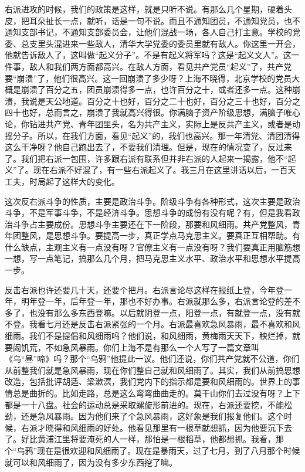 右派进攻的时候，我们的政策是这样，就是只听不说。有那么几个星期，硬着头皮，把耳朵扯长一点，就听，话是一句不说。而且不通知团员，不通知党员，也不通知支部书记，不通知支部委员会，让他们混战一场，各人自己打主意。学校的党委、总支里头混进来一些敌人，清华大学党委的委员里就有敌人。你这里一开会，他就告诉敌人了，这叫做“起义分子”。不是有起义将军吗？这是“起义文人”。这一件事，敌人和我们两方面都高兴。在敌人方面，看见共产党员“起义”了，共产党要“崩溃”了，他们很高兴。这一回崩溃了多少呀？上海不晓得，北京学校的党员大概是崩溃了百分之五，团员崩溃得多一点，也许百分之十，或者还多一点。这种崩溃，我说是天公地道。百分之十也好，百分之二十也好，百分之三十也好，百分之四十也好，总而言之，崩溃了我就高兴得很。你满脑子资产阶级思想，满脑子唯心论，你钻进共产党、青年团里头，名为共产主义，实际上是反共产主义，或者是动摇分子。所以，在我们方面，看见“起义”的，我们也高兴。那一年清党、清团清得这么干净呀？他自己跑出去了，不要我们清理。但是，现在的情况变了，反过来了。我们把右派一包围，许多跟右派有联系但并非右派的人起来一揭露，他不“起义”了。现在右派不好混了，有一些右派起义了。我三月在这里讲话以后，一百天工夫，时局起了这样大的变化。

这次反右派斗争的性质，主要是政治斗争。阶级斗争有各种形式，这次主要是政治斗争，不是军事斗争，不是经济斗争。思想斗争的成份有没有呢？有，但是我看政治斗争占主要成份。思想斗争主要还在下一阶段，那要和风细雨。共产党整风，青年团整风，是思想斗争。要提高一步，真正学点马克思主义。要真正互相帮助。有什么缺点，主观主义有一点没有呀？官僚主义有一点没有呀？我们要真正用脑筋想一想，写一点笔记，搞那么几个月，把马克思主义水平、政治水平和思想水平提高一步。

反击右派也许还要几十天，还要个把月。右派言论尽这样在报纸上登，今年登一年，明年登一年，后年登一年，那也不好办事。右派就那么多，右派言论登的差不多了，也没有那么多东西登嘛。以后就阴登一点，阳登一点，有就登一点，没有就不登。我看七月还是反击右派紧张的一个月。右派最喜欢急风暴雨，最不喜欢和风细雨。我们不是提倡和风细雨吗？他们说，和风细雨，黄梅雨天天下，秧烂掉，就要闹饥荒，不如急风暴雨。你们上海不是有那么一个人写了一篇文章叫《乌“昼”啼》吗？那个“乌鸦”他提此一议。他们还说，你们共产党就不公道，你们从前整我们就是急风暴雨，现在你们整自己就和风细雨了。其实，我们从前搞思想改造，包括批评胡适、梁漱溟，我们党内下的指示都是要和风细雨的。世界上的事情总是曲折的。比如走路，总是这么弯弯曲曲走的。莫干山你们去过没有呀？上下都是一十八盘。社会的运动总是采取螺旋形前进的。现在，右派还要挖，不能松劲，还是急风暴雨。因为他们来了个急风暴雨，这好象是我们报复他们。这个时候，右派才晓得和风细雨的好处。他看见那里有一根草就想抓，因为他要沉下去了。好比黄浦江里将要淹死的人一样，那怕是一根稻草，他都想抓。我看，那个“乌鸦”现在是很欢迎和风细雨了。现在是暴雨天，过了七月，到了八月那个时候就可以和风细雨了，因为没有多少东西挖了嘛。

